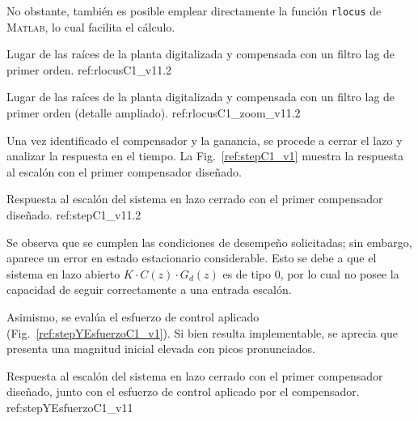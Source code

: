 No obstante, tambi\'en es posible emplear directamente la funci\'on \texttt{rlocus} de \textsc{Matlab}, lo cual facilita el c\'alculo.  

{Lugar de las ra\'ices de la planta digitalizada y compensada con un filtro lag de primer orden.}
{ref:rlocusC1_v1}{1.2}

{Lugar de las ra\'ices de la planta digitalizada y compensada con un filtro lag de primer orden (detalle ampliado).}
{ref:rlocusC1_zoom_v1}{1.2}

Una vez identificado el compensador y la ganancia, se procede a cerrar el lazo y analizar la respuesta en el tiempo. La Fig.~\ref{ref:stepC1_v1} muestra la respuesta al escal\'on con el primer compensador dise\~nado.  

{Respuesta al escal\'on del sistema en lazo cerrado con el primer compensador dise\~nado.}
{ref:stepC1_v1}{1.2}

Se observa que se cumplen las condiciones de desempe\~no solicitadas; sin embargo, aparece un error en estado estacionario considerable. Esto se debe a que el sistema en lazo abierto $K \cdot C(z) \cdot G_d(z)$ es de tipo 0, por lo cual no posee la capacidad de seguir correctamente a una entrada escal\'on.  

Asimismo, se eval\'ua el esfuerzo de control aplicado (Fig.~\ref{ref:stepYEsfuerzoC1_v1}). Si bien resulta implementable, se aprecia que presenta una magnitud inicial elevada con picos pronunciados.  

{Respuesta al escal\'on del sistema en lazo cerrado con el primer compensador dise\~nado, junto con el esfuerzo de control aplicado por el compensador.}
{ref:stepYEsfuerzoC1_v1}{1}


